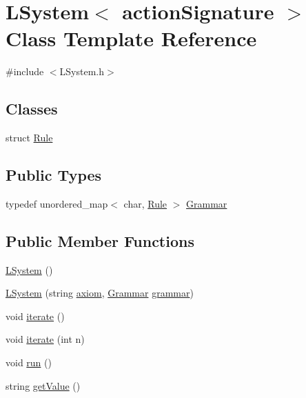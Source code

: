 \hypertarget{class_l_system}{}\section{L\+System$<$ action\+Signature $>$ Class Template Reference}
\label{class_l_system}


{\ttfamily \#include $<$L\+System.\+h$>$}

\subsection*{Classes}
\begin{DoxyCompactItemize}
\item 
struct \hyperlink{struct_l_system_1_1_rule}{Rule}
\end{DoxyCompactItemize}
\subsection*{Public Types}
\begin{DoxyCompactItemize}
\item 
typedef unordered\+\_\+map$<$ char, \hyperlink{struct_l_system_1_1_rule}{Rule} $>$ \hyperlink{class_l_system_a0bdb8daa8d07986e63fce89bbe0208a0}{Grammar}
\end{DoxyCompactItemize}
\subsection*{Public Member Functions}
\begin{DoxyCompactItemize}
\item 
\hyperlink{class_l_system_a04e9a16890e869cd117f575fe68f7bb5}{L\+System} ()
\item 
\hyperlink{class_l_system_aad68a517f0b7a522c36e82babe556c0f}{L\+System} (string \hyperlink{class_l_system_a661af6c14827f518abc35821faa376eb}{axiom}, \hyperlink{class_l_system_a0bdb8daa8d07986e63fce89bbe0208a0}{Grammar} \hyperlink{class_l_system_afff9095bb0b813cd80253489880a3344}{grammar})
\item 
void \hyperlink{class_l_system_a8df4917edfd45230005a0cdb4ecd8a62}{iterate} ()
\item 
void \hyperlink{class_l_system_a58d81a7e5b103501e4931e584bb8bcf6}{iterate} (int n)
\item 
void \hyperlink{class_l_system_a0e9929a784995b80aef7f76cd39794c9}{run} ()
\item 
string \hyperlink{class_l_system_ae4ac2576c59ca06dfeef1d3fe700d52d}{get\+Value} ()
\end{DoxyCompactItemize}
